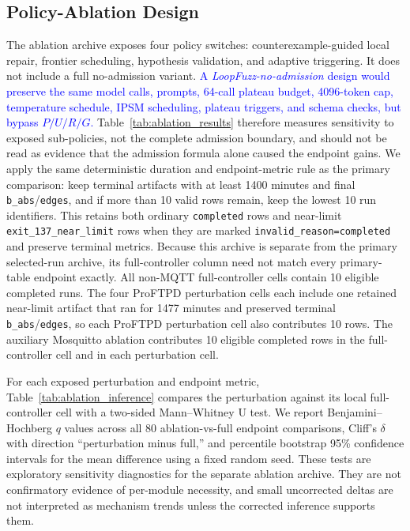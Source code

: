 \documentclass[final,5p,times,number]{elsarticle}
\begin{document}
\subsection{Policy-Ablation Design}
The ablation archive exposes four policy switches: counterexample-guided local repair, frontier scheduling, hypothesis validation, and adaptive triggering. It does not include a full no-admission variant. \textcolor{blue}{A \emph{LoopFuzz-no-admission} design would preserve the same model calls, prompts, 64-call plateau budget, 4096-token cap, temperature schedule, IPSM scheduling, plateau triggers, and schema checks, but bypass $P/U/R/G$.} Table~\ref{tab:ablation_results} therefore measures sensitivity to exposed sub-policies, not the complete admission boundary, and should not be read as evidence that the admission formula alone caused the endpoint gains. We apply the same deterministic duration and endpoint-metric rule as the primary comparison: keep terminal artifacts with at least 1400 minutes and final \texttt{b\_abs}/\texttt{edges}, and if more than 10 valid rows remain, keep the lowest 10 run identifiers. This retains both ordinary \texttt{completed} rows and near-limit \texttt{exit\_137\_near\_limit} rows when they are marked \texttt{invalid\_reason=completed} and preserve terminal metrics. Because this archive is separate from the primary selected-run archive, its full-controller column need not match every primary-table endpoint exactly. All non-MQTT full-controller cells contain 10 eligible completed runs. The four ProFTPD perturbation cells each include one retained near-limit artifact that ran for 1477 minutes and preserved terminal \texttt{b\_abs}/\texttt{edges}, so each ProFTPD perturbation cell also contributes 10 rows. The auxiliary Mosquitto ablation contributes 10 eligible completed rows in the full-controller cell and in each perturbation cell.

For each exposed perturbation and endpoint metric, Table~\ref{tab:ablation_inference} compares the perturbation against its local full-controller cell with a two-sided Mann--Whitney U test. We report Benjamini--Hochberg $q$ values across all 80 ablation-vs-full endpoint comparisons, Cliff's $\delta$ with direction ``perturbation minus full,'' and percentile bootstrap 95\% confidence intervals for the mean difference using a fixed random seed. These tests are exploratory sensitivity diagnostics for the separate ablation archive. They are not confirmatory evidence of per-module necessity, and small uncorrected deltas are not interpreted as mechanism trends unless the corrected inference supports them.
\end{document}
